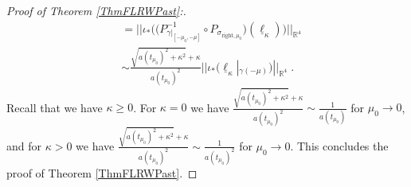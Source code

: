 \documentclass[reqno]{article}
\newcommand{\R}{\mathbb{R}}
\begin{document}
\begin{proof}[Proof of Theorem \ref{ThmFLRWPast}:]
\begin{equation*}
\begin{split}
&= ||\iota_* \Big( \big(P^{-1}_{\gamma|_{[-\mu_0,-\mu]}} \circ P_{\sigma_{\mathrm{right}, \mu_0}}\big) (\underline{\ell}_\kappa)\Big)||_{\R^4} \\
&\sim \frac{\sqrt{a(t_{\mu_0})^2 + \kappa^2} + \kappa}{a(t_{\mu_0})^2} || \iota_* \Big(\underline{\ell}_\kappa|_{\gamma(-\mu)}\Big)||_{\R^4} \;.
\end{split}
\end{equation*}
Recall that we have $\kappa \geq 0$. For $\kappa = 0$ we have $\frac{\sqrt{a(t_{\mu_0})^2 + \kappa^2} + \kappa}{a(t_{\mu_0})^2} \sim \frac{1}{a(t_{\mu_0})}$ for $\mu_0 \to 0$, and for $\kappa >0$ we have $\frac{\sqrt{a(t_{\mu_0})^2 + \kappa^2} + \kappa}{a(t_{\mu_0})^2} \sim \frac{1}{a(t_{\mu_0})^2}$ for $\mu_0 \to 0$.
This concludes the proof of Theorem \ref{ThmFLRWPast}.
\end{proof}
\end{document}
